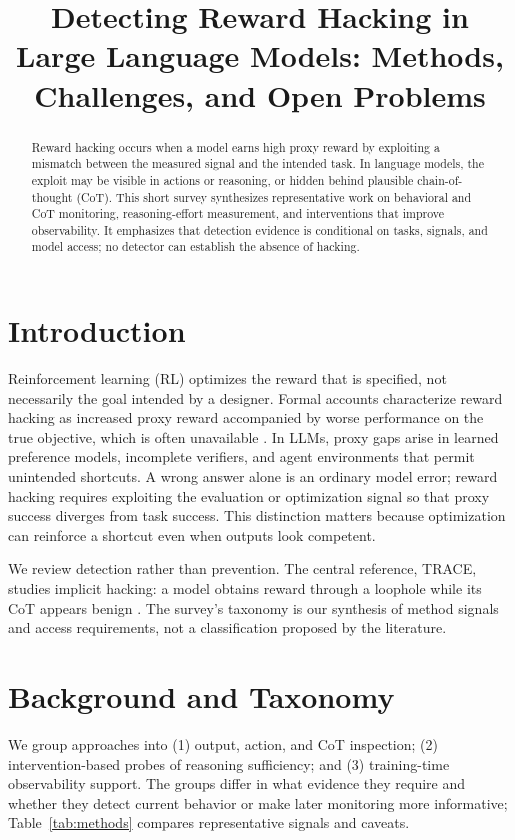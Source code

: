 \documentclass[sigconf,screen]{acmart}
\title{Detecting Reward Hacking in Large Language Models: Methods, Challenges, and Open Problems}
\begin{document}
\begin{abstract}
Reward hacking occurs when a model earns high proxy reward by exploiting a mismatch between the measured signal and the intended task. In language models, the exploit may be visible in actions or reasoning, or hidden behind plausible chain-of-thought (CoT). This short survey synthesizes representative work on behavioral and CoT monitoring, reasoning-effort measurement, and interventions that improve observability. It emphasizes that detection evidence is conditional on tasks, signals, and model access; no detector can establish the absence of hacking.
\end{abstract}
\maketitle
\section{Introduction}
Reinforcement learning (RL) optimizes the reward that is specified, not necessarily the goal intended by a designer. Formal accounts characterize reward hacking as increased proxy reward accompanied by worse performance on the true objective, which is often unavailable \cite{skalse2022,laidlaw2025}. In LLMs, proxy gaps arise in learned preference models, incomplete verifiers, and agent environments that permit unintended shortcuts. A wrong answer alone is an ordinary model error; reward hacking requires exploiting the evaluation or optimization signal so that proxy success diverges from task success. This distinction matters because optimization can reinforce a shortcut even when outputs look competent.

We review detection rather than prevention. The central reference, TRACE, studies implicit hacking: a model obtains reward through a loophole while its CoT appears benign \cite{wang2026trace}. The survey's taxonomy is our synthesis of method signals and access requirements, not a classification proposed by the literature.

\section{Background and Taxonomy}
We group approaches into (1) output, action, and CoT inspection; (2) intervention-based probes of reasoning sufficiency; and (3) training-time observability support. The groups differ in what evidence they require and whether they detect current behavior or make later monitoring more informative; Table~\ref{tab:methods} compares representative signals and caveats.
\end{document}

